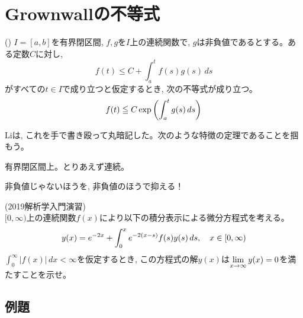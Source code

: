 \section{Grownwallの不等式}

\besha
\begin{theo} ()
$I=[a,b]$を有界閉区間, $f,g$を$I$上の連続関数で, $g$は非負値であるとする。ある定数$C$に対し,
\[f(t) \leq C+ \int_{a}^{t} f(s)g(s) \, ds\]
がすべての$t\in I$で成り立つと仮定するとき, 次の不等式が成り立つ。
\[ f(t) \leqq C\exp{\left( \int_{a}^{t} g(s)\, ds \right)} \]
\end{theo}
\ensha
\begin{point}
Liは, これを手で書き殴って丸暗記した。次のような特徴の定理であることを掴もう。
\ben
\item 有界閉区間上。とりあえず連続。
\item 非負値じゃないほうを, 非負値のほうで抑える！
\item {}
\een
\end{point}






\begin{egprob} (2019解析学入門演習)\\
$[0,\infty)$上の連続関数$f(x)$により以下の積分表示による微分方程式を考える。
\[y(x) = e^{-2x} + \displaystyle\int_{0}^{x} e^{-2(x-s)} f(s)y(s)\, ds, \quad x\in [0,\infty)\]
$\int_{0}^{\infty} |f(x)|\, dx < \infty$を仮定するとき, この方程式の解$y(x)$は$\displaystyle\lim_{x\to \infty}y(x) = 0$を満たすことを示せ。
\end{egprob}

\subsection{例題}








\clearpage
